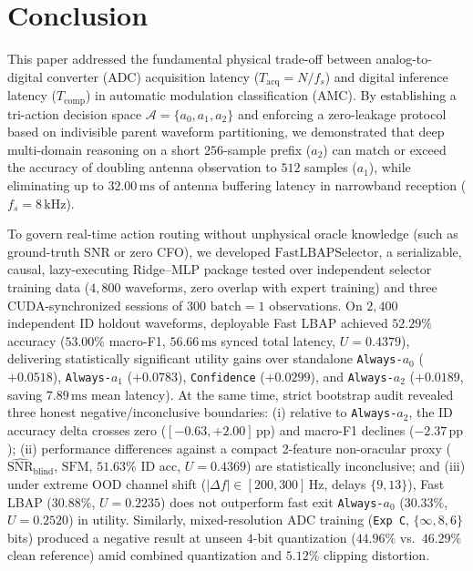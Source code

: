 \section{Conclusion}
\label{sec:conclusion}

This paper addressed the fundamental physical trade-off between analog-to-digital converter (ADC) acquisition latency ($T_{\mathrm{acq}} = N / f_s$) and digital inference latency ($T_{\mathrm{comp}}$) in automatic modulation classification (AMC). By establishing a tri-action decision space $\mathcal{A} = \{a_0, a_1, a_2\}$ and enforcing a zero-leakage protocol based on indivisible parent waveform partitioning, we demonstrated that deep multi-domain reasoning on a short $256$-sample prefix ($a_2$) can match or exceed the accuracy of doubling antenna observation to $512$ samples ($a_1$), while eliminating up to $32.00\,\mathrm{ms}$ of antenna buffering latency in narrowband reception ($f_s = 8\,\mathrm{kHz}$).

To govern real-time action routing without unphysical oracle knowledge (such as ground-truth SNR or zero CFO), we developed $\mathrm{FastLBAPSelector}$, a serializable, causal, lazy-executing Ridge--MLP package tested over independent selector training data ($4{,}800$ waveforms, zero overlap with expert training) and three CUDA-synchronized sessions of $300$ $\text{batch}=1$ observations. On $2{,}400$ independent ID holdout waveforms, deployable Fast LBAP achieved $52.29\%$ accuracy ($53.00\%$ macro-F1, $56.66\,\mathrm{ms}$ synced total latency, $U = 0.4379$), delivering statistically significant utility gains over standalone \texttt{Always-$a_0$} ($+0.0518$), \texttt{Always-$a_1$} ($+0.0783$), \texttt{Confidence} ($+0.0299$), and \texttt{Always-$a_2$} ($+0.0189$, saving $7.89\,\mathrm{ms}$ mean latency). At the same time, strict bootstrap audit revealed three honest negative/inconclusive boundaries: (i) relative to \texttt{Always-$a_2$}, the ID accuracy delta crosses zero ($[-0.63, +2.00]\,\mathrm{pp}$) and macro-F1 declines ($-2.37\,\mathrm{pp}$); (ii) performance differences against a compact 2-feature non-oracular proxy ($\widehat{\mathrm{SNR}}_{\mathrm{blind}}$, $\mathrm{SFM}$, $51.63\%$ ID acc, $U=0.4369$) are statistically inconclusive; and (iii) under extreme OOD channel shift ($|\Delta f|\in[200,300]\,\mathrm{Hz}$, delays $\{9,13\}$), Fast LBAP ($30.88\%$, $U=0.2235$) does not outperform fast exit \texttt{Always-$a_0$} ($30.33\%$, $U=0.2520$) in utility. Similarly, mixed-resolution ADC training (\texttt{Exp C}, $\{\infty, 8, 6\}$ bits) produced a negative result at unseen $4$-bit quantization ($44.96\%$ vs.\ $46.29\%$ clean reference) amid combined quantization and $5.12\%$ clipping distortion.

